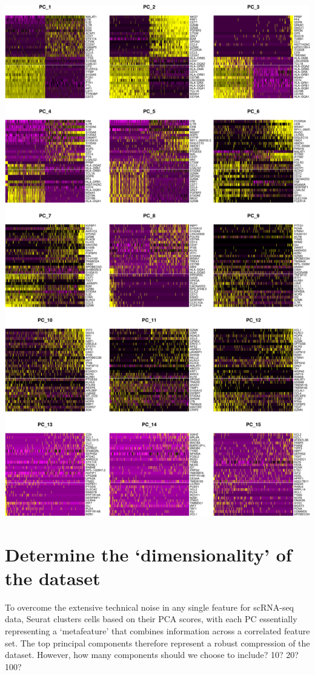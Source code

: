 \documentclass[
]{book}
\begin{document}
\includegraphics{scRNAseqInR_Doco_files/figure-latex/multi-heatmap-1.pdf}

\hypertarget{determine-the-dimensionality-of-the-dataset}{%
\section{Determine the `dimensionality' of the dataset}\label{determine-the-dimensionality-of-the-dataset}}

To overcome the extensive technical noise in any single feature for scRNA-seq data, Seurat clusters cells based on their PCA scores, with each PC essentially representing a `metafeature' that combines information across a correlated feature set. The top principal components therefore represent a robust compression of the dataset. However, how many components should we choose to include? 10? 20? 100?
\end{document}
